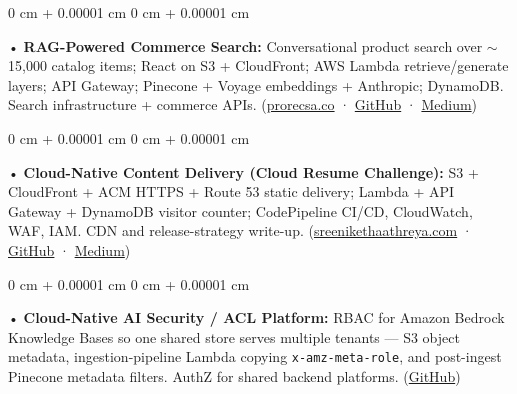 \documentclass[10pt, letterpaper]{article}
\newenvironment{onecolentry}{
    \begin{adjustwidth}{
        0 cm + 0.00001 cm
    }{
        0 cm + 0.00001 cm
    }
}{
    \end{adjustwidth}
} %
\begin{document}
\begin{onecolentry}
     • \textbf{RAG-Powered Commerce Search:} Conversational product search over $\sim$15,000 catalog items; React on S3 + CloudFront; AWS Lambda retrieve/generate layers; API Gateway; Pinecone + Voyage embeddings + Anthropic; DynamoDB. Search infrastructure + commerce APIs. (\href{https://prorecsa.co}{prorecsa.co} · \href{https://github.com/daedalus-s/ragops-doc}{GitHub} · \href{https://medium.com/@sreenikethaathreya/from-rags-to-riches-bba8a671d5e6}{Medium})
\end{onecolentry}
\begin{onecolentry}
     • \textbf{Cloud-Native Content Delivery (Cloud Resume Challenge):} S3 + CloudFront + ACM HTTPS + Route 53 static delivery; Lambda + API Gateway + DynamoDB visitor counter; CodePipeline CI/CD, CloudWatch, WAF, IAM. CDN and release-strategy write-up. (\href{https://sreenikethaathreya.com}{sreenikethaathreya.com} · \href{https://github.com/daedalus-s/resume-website}{GitHub} · \href{https://medium.com/@sreenikethaathreya/cloud-resume-challenge-c4f17c3d53ff}{Medium})
\end{onecolentry}
\begin{onecolentry}
     • \textbf{Cloud-Native AI Security / ACL Platform:} RBAC for Amazon Bedrock Knowledge Bases so one shared store serves multiple tenants --- S3 object metadata, ingestion-pipeline Lambda copying \texttt{x-amz-meta-role}, and post-ingest Pinecone metadata filters. AuthZ for shared backend platforms. (\href{https://github.com/daedalus-s/bedrock-acl-metadata}{GitHub})
\end{onecolentry}
\vspace{2 pt }
        \vspace{2 pt }
\end{document}
